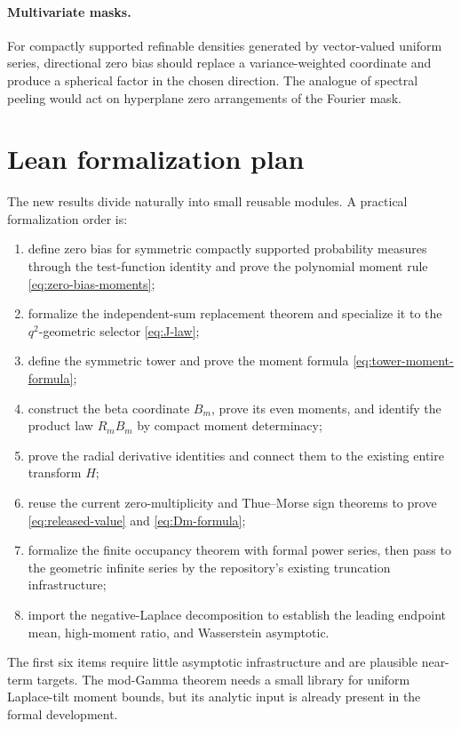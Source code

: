 \documentclass[11pt,oneside]{article}
\theoremstyle{definition}
\theoremstyle{remark}
\begin{document}
\paragraph{Multivariate masks.}
For compactly supported refinable densities generated by vector-valued uniform
series, directional zero bias should replace a variance-weighted coordinate
and produce a spherical factor in the chosen direction.  The analogue of
spectral peeling would act on hyperplane zero arrangements of the Fourier
mask.

\section{Lean formalization plan}
\label{sec:lean-plan}

The new results divide naturally into small reusable modules.  A practical
formalization order is:
\begin{enumerate}
\item define zero bias for symmetric compactly supported probability measures
      through the test-function identity and prove the polynomial moment rule
      \eqref{eq:zero-bias-moments};
\item formalize the independent-sum replacement theorem and specialize it to
      the $q^2$-geometric selector \eqref{eq:J-law};
\item define the symmetric tower and prove the moment formula
      \eqref{eq:tower-moment-formula};
\item construct the beta coordinate $B_m$, prove its even moments, and identify
      the product law $R_mB_m$ by compact moment determinacy;
\item prove the radial derivative identities and connect them to the existing
      entire transform $H$;
\item reuse the current zero-multiplicity and Thue--Morse sign theorems to prove
      \eqref{eq:released-value} and \eqref{eq:Dm-formula};
\item formalize the finite occupancy theorem with formal power series, then
      pass to the geometric infinite series by the repository's existing
      truncation infrastructure;
\item import the negative-Laplace decomposition to establish the leading
      endpoint mean, high-moment ratio, and Wasserstein asymptotic.
\end{enumerate}
The first six items require little asymptotic infrastructure and are plausible
near-term targets.  The mod-Gamma theorem needs a small library for uniform
Laplace-tilt moment bounds, but its analytic input is already present in the
formal development.
\end{document}
